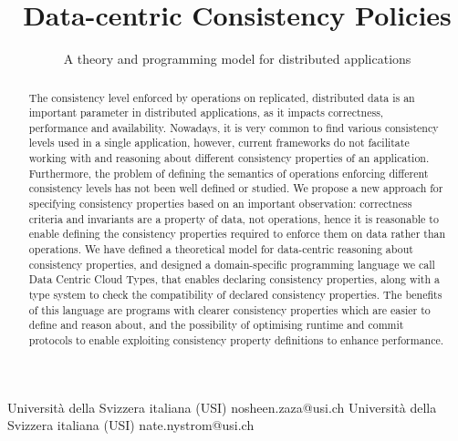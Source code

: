 \documentclass[preprint, numbers]{sigplanconf}
\begin{document}
\setlength{\pdfpageheight}{\paperheight}
\setlength{\pdfpagewidth}{\paperwidth}




\title{Data-centric Consistency Policies}
\subtitle{A theory and programming model for distributed applications}

           {Universit\`a della Svizzera italiana (USI)}
           {nosheen.zaza@usi.ch}
           {Universit\`a della Svizzera italiana (USI)}
           {nate.nystrom@usi.ch}

\maketitle

\begin{abstract}
The consistency level enforced by operations on replicated, distributed data is 
an important parameter in distributed applications, as it impacts correctness, 
performance and availability. Nowadays, it is very common to find various consistency
levels used in a single application, however, current frameworks do not facilitate
working with and reasoning about different consistency properties of an application. 
Furthermore, the problem of defining the semantics of operations enforcing different 
consistency levels has not been well defined or studied. We propose a new
approach for specifying consistency properties based on an important observation: 
correctness criteria and invariants are a property of data, not operations, hence it is 
reasonable to enable defining the consistency properties required to enforce them on data 
rather than operations. We have defined a theoretical model for data-centric reasoning about consistency
properties, and designed a domain-specific programming language we call Data Centric Cloud Types, that enables 
declaring consistency properties, along with a type system to check the compatibility of declared consistency 
properties. The benefits of this language are programs with clearer consistency properties which are 
easier to define and reason about, and the possibility of optimising runtime and commit protocols to enable 
exploiting consistency property definitions to enhance performance.
\end{abstract}
\end{document}
